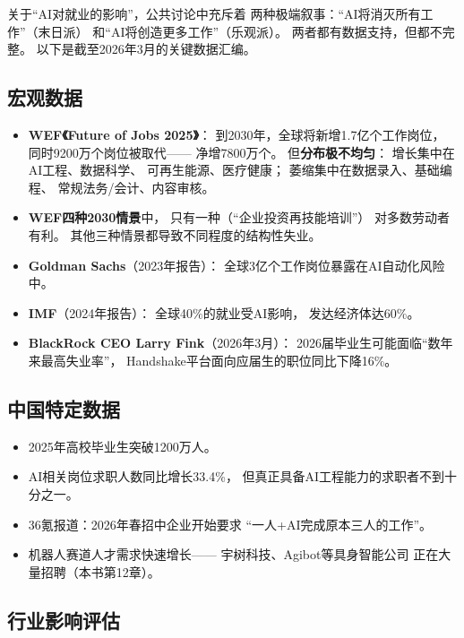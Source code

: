 关于``AI对就业的影响''，公共讨论中充斥着
两种极端叙事：``AI将消灭所有工作''（末日派）
和``AI将创造更多工作''（乐观派）。
两者都有数据支持，但都不完整。
以下是截至2026年3月的关键数据汇编。

\subsection{宏观数据}

\begin{itemize}
  \item \textbf{WEF《Future of Jobs 2025》}：
    到2030年，全球将新增1.7亿个工作岗位，
    同时9200万个岗位被取代——
    净增7800万个。
    但\textbf{分布极不均匀}：
    增长集中在AI工程、数据科学、
    可再生能源、医疗健康；
    萎缩集中在数据录入、基础编程、
    常规法务/会计、内容审核。
  \item \textbf{WEF四种2030情景}中，
    只有一种（``企业投资再技能培训''）
    对多数劳动者有利。
    其他三种情景都导致不同程度的结构性失业。
  \item \textbf{Goldman Sachs}（2023年报告）：
    全球3亿个工作岗位暴露在AI自动化风险中。
  \item \textbf{IMF}（2024年报告）：
    全球40\%的就业受AI影响，
    发达经济体达60\%。
  \item \textbf{BlackRock CEO Larry Fink}（2026年3月）：
    2026届毕业生可能面临``数年来最高失业率''，
    Handshake平台面向应届生的职位同比下降16\%。
\end{itemize}

\subsection{中国特定数据}

\begin{itemize}
  \item 2025年高校毕业生突破1200万人。
  \item AI相关岗位求职人数同比增长33.4\%，
    但真正具备AI工程能力的求职者不到十分之一。
  \item 36氪报道：2026年春招中企业开始要求
    ``一人+AI完成原本三人的工作''。
  \item 机器人赛道人才需求快速增长——
    宇树科技、Agibot等具身智能公司
    正在大量招聘（本书第12章）。
\end{itemize}

\subsection{行业影响评估}

